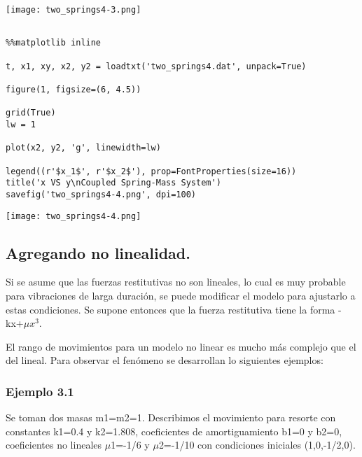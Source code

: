 \documentclass{article} %
\begin{document}
\begin{center}
 	\texttt{[image: two\_springs4-3.png]}
 \end{center}



\begin{verbatim} 

%%matplotlib inline

t, x1, xy, x2, y2 = loadtxt('two_springs4.dat', unpack=True)

figure(1, figsize=(6, 4.5))

grid(True)
lw = 1

plot(x2, y2, 'g', linewidth=lw)

legend((r'$x_1$', r'$x_2$'), prop=FontProperties(size=16))
title('x VS y\nCoupled Spring-Mass System')
savefig('two_springs4-4.png', dpi=100)

\end{verbatim}



\begin{center}
 	\texttt{[image: two\_springs4-4.png]}
 \end{center}


\subsection{Agregando no linealidad.}

Si se asume que las fuerzas restitutivas no son lineales, lo cual es muy probable para vibraciones de larga duración, se puede modificar el modelo para ajustarlo a estas condiciones. Se supone entonces que la fuerza restitutiva tiene la forma -kx+$\mu x^3$.

\vspace{0.5 cm}

El rango de movimientos para un modelo no linear es mucho más complejo que el del lineal. Para observar el fenómeno se desarrollan lo siguientes ejemplos:


\subsubsection{Ejemplo 3.1}

Se toman dos masas m1=m2=1. Describimos el movimiento para resorte con constantes k1=0.4 y k2=1.808, coeficientes de amortiguamiento b1=0 y b2=0, coeficientes no lineales $\mu$1=-1/6 y $\mu$2=-1/10 con condiciones iniciales (1,0,-1/2,0).

\vspace{0.5 cm}
\end{document}
